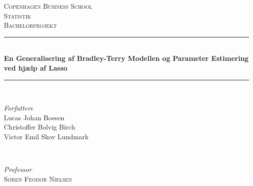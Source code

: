 \documentclass[11pt,a4paper]{article}
\begin{document}
\begin{titlepage} %
	\newcommand{\HRule}{\rule{\linewidth}{0.5mm}} %
	
	\center %
	
	
	\textsc{\LARGE Copenhagen Business School}\\[1.5cm] %
	
	\textsc{\Large Statistik}\\[0.5cm] %
	
	\textsc{\large Bachelorprojekt}\\[0.5cm] %
	
	
	\HRule\\[0.4cm]
	
	{\huge\bfseries En Generalisering af Bradley-Terry Modellen og Parameter Estimering ved hjælp af Lasso}\\[0.4cm] %
	
	\HRule\\[1.5cm]
	
	
	\begin{minipage}{0.4\textwidth}
		\begin{flushleft}
			\large
			\textit{Forfattere}\\
			Lucas Johan Boesen\\ %
			Christoffer Bolvig Birch\\ %
			Victor Emil Skov Lundmark\\ %
		\end{flushleft}
	\end{minipage}
	~
	\begin{minipage}{0.4\textwidth}
		\begin{flushright}
			\large
			\textit{Professor}\\
			\textsc{Søren Feodor Nielsen}\\
			\textsc{}\\
			\textsc{}\\%
		\end{flushright}
	\end{minipage}
	

\end{titlepage}
\end{document}
